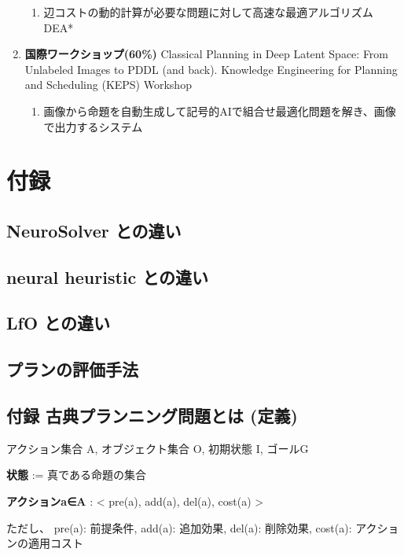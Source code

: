\begin{smaller}
\begin{enumerate}
\begin{enumerate}
\item 辺コストの動的計算が必要な問題に対して高速な最適アルゴリズムDEA*
\end{enumerate}
\item \textbf{国際ワークショップ(60\%)} Classical Planning in Deep Latent Space: From Unlabeled Images to PDDL (and back).
Knowledge Engineering for Planning and Scheduling (KEPS) Workshop
\begin{enumerate}
\item 画像から命題を自動生成して記号的AIで組合せ最適化問題を解き、画像で出力するシステム
\end{enumerate}
\end{enumerate}
\end{smaller}

\section{付録}
\label{sec-5}
\subsection{NeuroSolver との違い}
\label{sec-5-1}

\subsection{neural heuristic との違い}
\label{sec-5-2}

\subsection{LfO との違い}
\label{sec-5-3}

\subsection{プランの評価手法}
\label{sec-5-4}

\subsection{付録 古典プランニング問題とは (定義)}
\label{sec-5-5}

アクション集合 A, オブジェクト集合 O, 初期状態 I, ゴールG

\textbf{状態} := 真である命題の集合

\textbf{アクションa∈A} : < pre(a), add(a), del(a), cost(a) >

ただし、 pre(a): 前提条件, add(a): 追加効果, del(a): 削除効果, cost(a): アクションの適用コスト

